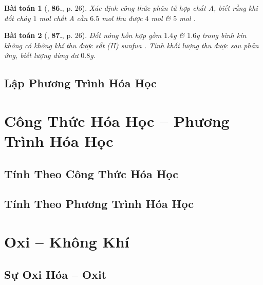 \documentclass{article}
\numberwithin{equation}{section}
\newtheorem{baitoan}{Bài toán}[section]
\begin{document}
\begin{baitoan}[\cite{An2011}, \textbf{86.}, p. 26]
	Xác định công thức phân tử hợp chất A, biết rằng khi đốt cháy $1$ mol chất A cần $6.5$ mol  thu được $4$ mol  \& $5$ mol .
\end{baitoan}

\begin{baitoan}[\cite{An2011}, \textbf{87.}, p. 26]
	Đốt nóng hỗn hợp gồm $1.4$g  \& $1.6$g  trong bình kín không có không khí thu được sắt (II) sunfua . Tính khối lượng  thu được sau phản ứng, biết lượng  dùng dư $0.8$g.
\end{baitoan}


\subsection{Lập Phương Trình Hóa Học}


\section{Công Thức Hóa Học -- Phương Trình Hóa Học}

\subsection{Tính Theo Công Thức Hóa Học}


\subsection{Tính Theo Phương Trình Hóa Học}


\section{Oxi -- Không Khí}

\subsection{Sự Oxi Hóa -- Oxit}
\end{document}

